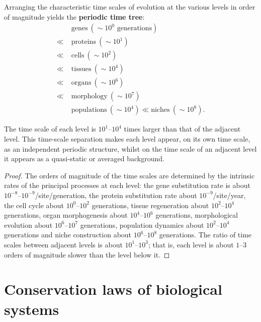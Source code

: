\begin{theorem}
\label{thm:multi_scale_period_tree}
Arranging the characteristic time scales of evolution at the various levels in order of magnitude
yields the \textbf{periodic time tree}:
\[
\begin{aligned}
&\text{genes} \ (\sim 10^0 \text{ generations}) \\
\ll\;&\text{proteins} \ (\sim 10^1) \\
\ll\;&\text{cells} \ (\sim 10^2) \\
\ll\;&\text{tissues} \ (\sim 10^4) \\
\ll\;&\text{organs} \ (\sim 10^6) \\
\ll\;&\text{morphology} \ (\sim 10^7) \\[4pt]
&\text{populations} \ (\sim 10^4) \ll \text{niches} \ (\sim 10^8).
\end{aligned}
\]

The time scale of each level is $10^1$--$10^4$ times larger than that of the adjacent level.
This time-scale separation makes each level appear, on its own time scale,
as an independent periodic structure,
whilst on the time scale of an adjacent level it appears as
a quasi-static or averaged background.
\end{theorem}

\begin{proof}
The orders of magnitude of the time scales are determined by the intrinsic rates of the principal processes at each level: the gene substitution rate is about $10^{-8}$--$10^{-9}$/site/generation, the protein substitution rate about $10^{-9}$/site/year, the cell cycle about $10^0$--$10^2$ generations, tissue regeneration about $10^2$--$10^4$ generations, organ morphogenesis about $10^4$--$10^6$ generations, morphological evolution about $10^6$--$10^7$ generations, population dynamics about $10^2$--$10^4$ generations and niche construction about $10^6$--$10^8$ generations. The ratio of time scales between adjacent levels is about $10^1$--$10^3$; that is, each level is about $1$--$3$ orders of magnitude slower than the level below it.
\end{proof}

\section{Conservation laws of biological systems}

